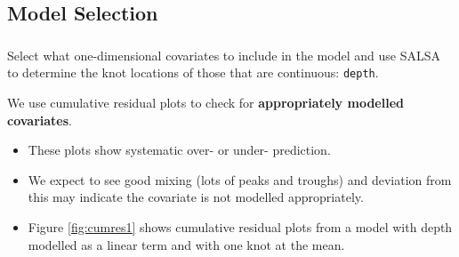 \clearpage

\subsection{Model Selection}
\begin{frame}[fragile]
\frametitle{}
Select what one-dimensional covariates to include in the model and use SALSA to determine the knot locations of those that are continuous: {\tt depth}.

\noindent We use cumulative residual plots to check for \textbf{appropriately modelled covariates}.  
\begin{itemize}
\item These plots show systematic over- or under- prediction.  
\item We expect to see good mixing (lots of peaks and troughs) and deviation from this may indicate the covariate is not modelled appropriately.
\item Figure \ref{fig:cumres1} shows cumulative residual plots from a model with depth modelled as a linear term and with one knot at the mean.
\end{itemize} 
\end{frame}

